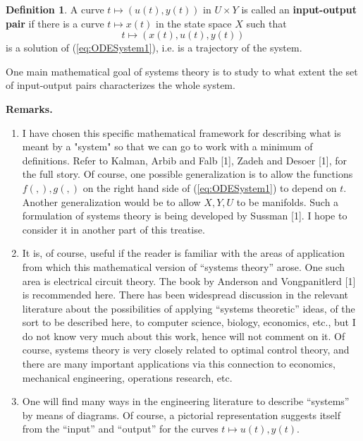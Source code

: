 \documentclass[12pt]{book}
\theoremstyle{plain}
\theoremstyle{definition}
\newtheorem{definition}{Definition}[section]
\begin{document}
\begin{definition}
A curve $t \mapsto (u(t), y(t))$ in $U \times Y$ is called an \textbf{input-output pair} if there is a curve $t \mapsto x(t)$ in the state space $X$ such that
$$t \mapsto (x(t), u(t), y(t))$$
is a solution of (\ref{eq:ODESystem1}), i.e. is a trajectory of the system.
\end{definition}

One main mathematical goal of systems theory is to study to what extent the set of input-output pairs characterizes the whole system.

\textbf{Remarks.} %
\begin{enumerate}
    \item I have chosen this specific mathematical framework for describing what is meant by a "system" so that we can go to work with a minimum of definitions.
    Refer to Kalman, Arbib and Falb [1], Zadeh and Desoer [1], for the full story. %
    Of course, one possible generalization is to allow the functions $f( , ), g( , )$ on the right hand side of (\ref{eq:ODESystem1}) to depend on $t$.
    Another generalization would be to allow $X, Y, U$ to be manifolds.
    Such a formulation of systems theory is being developed by Sussman [1]. %
    I hope to consider it in another part of this treatise.
    \item It is, of course, useful if the reader is familiar with the areas of application from which this mathematical version of ``systems theory'' arose.
    One such area is electrical circuit theory.
    The book by Anderson and Vongpanitlerd [1] is recommended here. %
    There has been widespread discussion in the relevant literature about the possibilities of applying ``systems theoretic'' ideas, of the sort to be described here, to computer science, biology, economics, etc., but I do not know very much about this work, hence will not comment on it.
    Of course, systems theory is very closely related to optimal control theory, and there are many important applications via this connection to economics, mechanical engineering, operations research, etc.
    \item One will find many ways in the engineering literature to describe ``systems'' by means of diagrams.
    Of course, a pictorial representation suggests itself from the ``input'' and ``output'' for the curves $t \mapsto u(t), y(t)$.


\end{enumerate}
\end{document}
